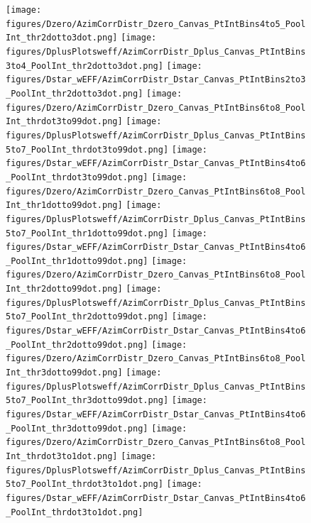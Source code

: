 \begin{figure}[!htbp]
\centering
{\texttt{[image: figures/Dzero/AzimCorrDistr\_Dzero\_Canvas\_PtIntBins4to5\_PoolInt\_thr2dotto3dot.png]}} 
{\texttt{[image: figures/DplusPlotsweff/AzimCorrDistr\_Dplus\_Canvas\_PtIntBins3to4\_PoolInt\_thr2dotto3dot.png]}} 
{\texttt{[image: figures/Dstar\_wEFF/AzimCorrDistr\_Dstar\_Canvas\_PtIntBins2to3\_PoolInt\_thr2dotto3dot.png]}} 
{\texttt{[image: figures/Dzero/AzimCorrDistr\_Dzero\_Canvas\_PtIntBins6to8\_PoolInt\_thrdot3to99dot.png]}} 
{\texttt{[image: figures/DplusPlotsweff/AzimCorrDistr\_Dplus\_Canvas\_PtIntBins5to7\_PoolInt\_thrdot3to99dot.png]}} 
{\texttt{[image: figures/Dstar\_wEFF/AzimCorrDistr\_Dstar\_Canvas\_PtIntBins4to6\_PoolInt\_thrdot3to99dot.png]}} 
{\texttt{[image: figures/Dzero/AzimCorrDistr\_Dzero\_Canvas\_PtIntBins6to8\_PoolInt\_thr1dotto99dot.png]}} 
{\texttt{[image: figures/DplusPlotsweff/AzimCorrDistr\_Dplus\_Canvas\_PtIntBins5to7\_PoolInt\_thr1dotto99dot.png]}} 
{\texttt{[image: figures/Dstar\_wEFF/AzimCorrDistr\_Dstar\_Canvas\_PtIntBins4to6\_PoolInt\_thr1dotto99dot.png]}}
{\texttt{[image: figures/Dzero/AzimCorrDistr\_Dzero\_Canvas\_PtIntBins6to8\_PoolInt\_thr2dotto99dot.png]}} 
{\texttt{[image: figures/DplusPlotsweff/AzimCorrDistr\_Dplus\_Canvas\_PtIntBins5to7\_PoolInt\_thr2dotto99dot.png]}} 
{\texttt{[image: figures/Dstar\_wEFF/AzimCorrDistr\_Dstar\_Canvas\_PtIntBins4to6\_PoolInt\_thr2dotto99dot.png]}}
{\texttt{[image: figures/Dzero/AzimCorrDistr\_Dzero\_Canvas\_PtIntBins6to8\_PoolInt\_thr3dotto99dot.png]}} 
{\texttt{[image: figures/DplusPlotsweff/AzimCorrDistr\_Dplus\_Canvas\_PtIntBins5to7\_PoolInt\_thr3dotto99dot.png]}} 
{\texttt{[image: figures/Dstar\_wEFF/AzimCorrDistr\_Dstar\_Canvas\_PtIntBins4to6\_PoolInt\_thr3dotto99dot.png]}}
{\texttt{[image: figures/Dzero/AzimCorrDistr\_Dzero\_Canvas\_PtIntBins6to8\_PoolInt\_thrdot3to1dot.png]}} 
{\texttt{[image: figures/DplusPlotsweff/AzimCorrDistr\_Dplus\_Canvas\_PtIntBins5to7\_PoolInt\_thrdot3to1dot.png]}} 
{\texttt{[image: figures/Dstar\_wEFF/AzimCorrDistr\_Dstar\_Canvas\_PtIntBins4to6\_PoolInt\_thrdot3to1dot.png]}} 
\end{figure}
